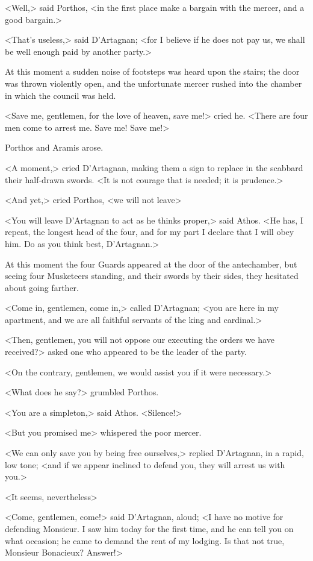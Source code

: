 <Well,> said Porthos, <in the first place make a bargain with the mercer, and a good bargain.> 

<That's useless,> said D'Artagnan; <for I believe if he does not pay us, we shall be well enough paid by another party.> 

At this moment a sudden noise of footsteps was heard upon the stairs; the door was thrown violently open, and the unfortunate mercer rushed into the chamber in which the council was held. 

<Save me, gentlemen, for the love of heaven, save me!> cried he. <There are four men come to arrest me. Save me! Save me!> 

Porthos and Aramis arose. 

<A moment,> cried D'Artagnan, making them a sign to replace in the scabbard their half-drawn swords. <It is not courage that is needed; it is prudence.> 

<And yet,> cried Porthos, <we will not leave\longdash> 

<You will leave D'Artagnan to act as he thinks proper,> said Athos. <He has, I repeat, the longest head of the four, and for my part I declare that I will obey him. Do as you think best, D'Artagnan.> 

At this moment the four Guards appeared at the door of the antechamber, but seeing four Musketeers standing, and their swords by their sides, they hesitated about going farther. 

<Come in, gentlemen, come in,> called D'Artagnan; <you are here in my apartment, and we are all faithful servants of the king and cardinal.> 

<Then, gentlemen, you will not oppose our executing the orders we have received?> asked one who appeared to be the leader of the party. 

<On the contrary, gentlemen, we would assist you if it were necessary.> 

<What does he say?> grumbled Porthos. 

<You are a simpleton,> said Athos. <Silence!> 

<But you promised me\longdash> whispered the poor mercer. 

<We can only save you by being free ourselves,> replied D'Artagnan, in a rapid, low tone; <and if we appear inclined to defend you, they will arrest us with you.> 

<It seems, nevertheless\longdash> 

<Come, gentlemen, come!> said D'Artagnan, aloud; <I have no motive for defending Monsieur. I saw him today for the first time, and he can tell you on what occasion; he came to demand the rent of my lodging. Is that not true, Monsieur Bonacieux? Answer!> 

